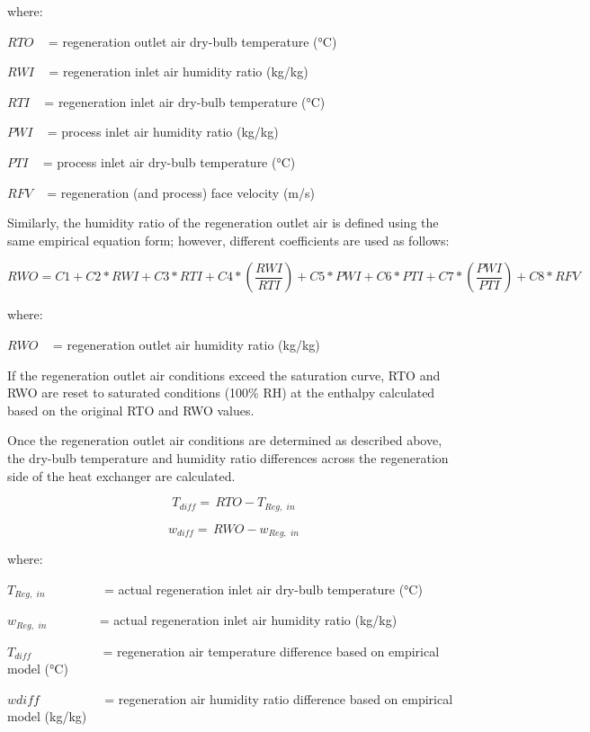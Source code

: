 where:

\(RTO\) ~ = regeneration outlet air dry-bulb temperature (°C)

\(RWI\) ~ = regeneration inlet air humidity ratio (kg/kg)

\(RTI\) ~ = regeneration inlet air dry-bulb temperature (°C)

\(PWI\) ~ = process inlet air humidity ratio (kg/kg)

\(PTI\) ~ = process inlet air dry-bulb temperature (°C)

\(RFV\) ~ = regeneration (and process) face velocity (m/s)

Similarly, the humidity ratio of the regeneration outlet air is defined using the same empirical equation form; however, different coefficients are used as follows:

\begin{equation}
RWO = C1 + C2*RWI + C3*RTI + C4*\left( {\frac{{RWI}}{{RTI}}} \right) + C5*PWI + C6*PTI + C7*\left( {\frac{{PWI}}{{PTI}}} \right) + C8*RFV
\end{equation}

where:

\(RWO\) ~ = regeneration outlet air humidity ratio (kg/kg)

If the regeneration outlet air conditions exceed the saturation curve, RTO and RWO are reset to saturated conditions (100\% RH) at the enthalpy calculated based on the original RTO and RWO values.

Once the regeneration outlet air conditions are determined as described above, the dry-bulb temperature and humidity ratio differences across the regeneration side of the heat exchanger are calculated.

\begin{equation}
{T_{diff}} = \,RTO - {T_{Reg,\,\,in}}
\end{equation}

\begin{equation}
{w_{diff}} = \,RWO - {w_{Reg,\,\,in}}
\end{equation}

where:

\({T_{Reg,\,\,in}}\) ~~~~~~~~ = actual regeneration inlet air dry-bulb temperature (°C)

\({w_{Reg,\,\,in}}\) ~~~~~~~ = actual regeneration inlet air humidity ratio (kg/kg)

\({T_{diff}}\) ~~~~~~~~~~ = regeneration air temperature difference based on empirical model (°C)

\(wdiff\) ~~~~~~~~~ = regeneration air humidity ratio difference based on empirical model (kg/kg)


